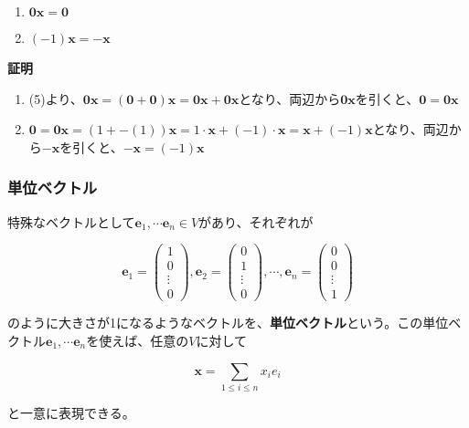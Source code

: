 \documentclass[dvipdfmx,autodetect-engine]{jsarticle}
\begin{document}

\begin{enumerate}
\renewcommand{\labelenumi}{(\arabic{enumi})}
\item $\bm{0}\bm{x} = \bm{0}$
\item $(-1)\bm{x} = -\bm{x}$
\end{enumerate}

{\bf 証明}

\begin{enumerate}
\renewcommand{\labelenumi}{(\arabic{enumi})}
\item (5)より、$\bm{0}\bm{x} = (\bm{0} + \bm{0})\bm{x} = \bm{0}\bm{x} + \bm{0}\bm{x}$となり、両辺から$\bm{0}\bm{x}$を引くと、$\bm{0} = \bm{0}\bm{x}$
\item $\bm{0} = \bm{0}\bm{x} = (1 + -(1))\bm{x} = 1 \cdot \bm{x} + (-1) \cdot \bm{x} = \bm{x} + (-1)\bm{x}$となり、両辺から$-\bm{x}$を引くと、$-\bm{x} = (-1)\bm{x}$
\end{enumerate}

\subsubsection{単位ベクトル}\label{subsection:unitVector}

特殊なベクトルとして$\bm{e}_1, \cdots \bm{e}_n \in V$があり、それぞれが

$$
\bm{e}_1 = \begin{pmatrix}
1 \\
0 \\
\vdots \\
0
\end{pmatrix},
\bm{e}_2 = \begin{pmatrix}
0 \\
1 \\
\vdots \\
0
\end{pmatrix}, 
\cdots, 
\bm{e}_n = \begin{pmatrix}
0 \\
0 \\
\vdots \\
1
\end{pmatrix}
$$

のように大きさが1になるようなベクトルを、{\bf 単位ベクトル}という。この単位ベクトル$\bm{e}_1, \cdots \bm{e}_n$を使えば、任意の$V$に対して

$$
\bm{x} = \sum_{1 \leq i \leq n} x_ie_i
$$

と一意に表現できる。
\end{document}
